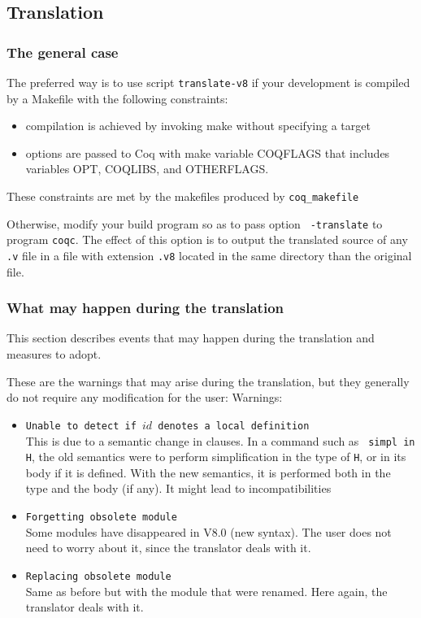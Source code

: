 \documentclass[11pt,a4paper]{article}
\begin{document}
\subsection{Translation}

\subsubsection{The general case}

The preferred way is to use script {\tt translate-v8} if your development
is compiled by a Makefile with the following constraints:
\begin{itemize}
\item compilation is achieved by invoking make without specifying a target
\item options are passed to Coq with make variable COQFLAGS that
  includes variables OPT, COQLIBS, and OTHERFLAGS.
\end{itemize}
These constraints are met by the makefiles produced by {\tt coq\_makefile}

Otherwise, modify your build program so as to pass option {\tt
-translate} to program {\tt coqc}. The effect of this option is to
output the translated source of any {\tt .v} file in a file with
extension {\tt .v8} located in the same directory than the original
file.

\subsubsection{What may happen during the translation}

This section describes events that may happen during the
translation and measures to adopt.

These are the warnings that may arise during the translation, but they
generally do not require any modification for the user:
Warnings:
\begin{itemize}
\item {\tt Unable to detect if $id$ denotes a local definition}\\
This is due to a semantic change in clauses. In a command such as {\tt
simpl in H}, the old semantics were to perform simplification in the
type of {\tt H}, or in its body if it is defined. With the new
semantics, it is performed both in the type and the body (if any). It
might lead to incompatibilities

\item {\tt Forgetting obsolete module}\\
Some modules have disappeared in V8.0 (new syntax). The user does not
need to worry about it, since the translator deals with it.

\item {\tt Replacing obsolete module}\\
Same as before but with the module that were renamed. Here again, the
translator deals with it.
\end{itemize}
\end{document}
